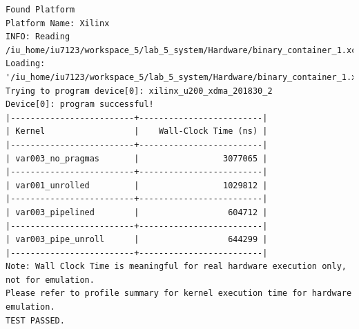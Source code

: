 \clearpage

\begin{lstlisting}[caption=Результаты работы]
Found Platform
Platform Name: Xilinx
INFO: Reading /iu_home/iu7123/workspace_5/lab_5_system/Hardware/binary_container_1.xclbin
Loading: '/iu_home/iu7123/workspace_5/lab_5_system/Hardware/binary_container_1.xclbin'
Trying to program device[0]: xilinx_u200_xdma_201830_2
Device[0]: program successful!
|-------------------------+-------------------------|
| Kernel                  |    Wall-Clock Time (ns) |
|-------------------------+-------------------------|
| var003_no_pragmas       |                 3077065 |
|-------------------------+-------------------------|
| var001_unrolled         |                 1029812 |
|-------------------------+-------------------------|
| var003_pipelined        |                  604712 |
|-------------------------+-------------------------|
| var003_pipe_unroll      |                  644299 |
|-------------------------+-------------------------|
Note: Wall Clock Time is meaningful for real hardware execution only, not for emulation.
Please refer to profile summary for kernel execution time for hardware emulation.
TEST PASSED.
\end{lstlisting}
